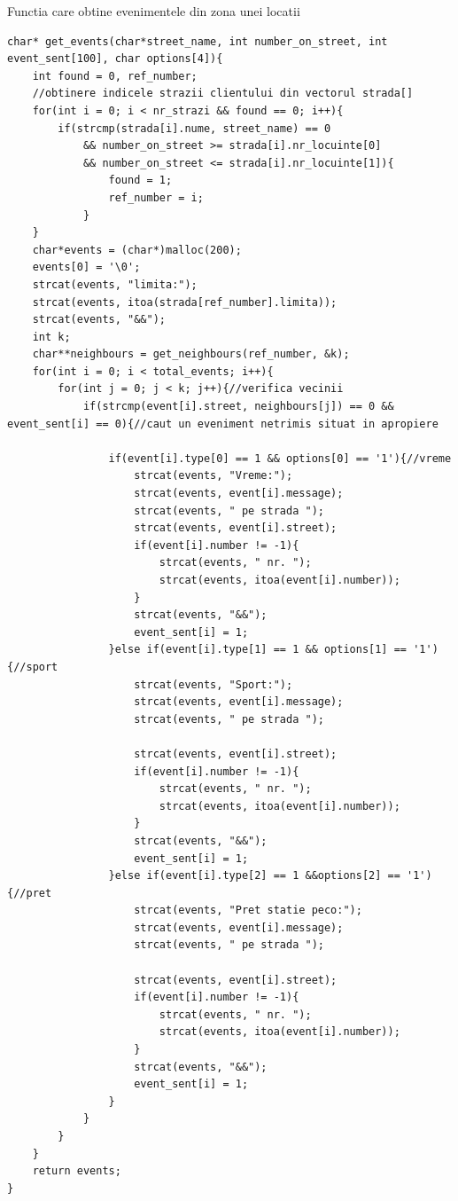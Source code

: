 \documentclass[runningheads]{llncs}
\begin{document}
Functia care obtine evenimentele din zona unei locatii
\begin{lstlisting}
char* get_events(char*street_name, int number_on_street, int event_sent[100], char options[4]){
    int found = 0, ref_number;
    //obtinere indicele strazii clientului din vectorul strada[]
    for(int i = 0; i < nr_strazi && found == 0; i++){
        if(strcmp(strada[i].nume, street_name) == 0 
            && number_on_street >= strada[i].nr_locuinte[0]                                    
            && number_on_street <= strada[i].nr_locuinte[1]){
                found = 1;
                ref_number = i;
            }
    }
    char*events = (char*)malloc(200);
    events[0] = '\0';
    strcat(events, "limita:");
    strcat(events, itoa(strada[ref_number].limita));
    strcat(events, "&&");
    int k;
    char**neighbours = get_neighbours(ref_number, &k);
    for(int i = 0; i < total_events; i++){
        for(int j = 0; j < k; j++){//verifica vecinii
            if(strcmp(event[i].street, neighbours[j]) == 0 && event_sent[i] == 0){//caut un eveniment netrimis situat in apropiere

                if(event[i].type[0] == 1 && options[0] == '1'){//vreme
                    strcat(events, "Vreme:");
                    strcat(events, event[i].message);
                    strcat(events, " pe strada ");
                    strcat(events, event[i].street);
                    if(event[i].number != -1){
                        strcat(events, " nr. ");
                        strcat(events, itoa(event[i].number));
                    }
                    strcat(events, "&&");
                    event_sent[i] = 1;
                }else if(event[i].type[1] == 1 && options[1] == '1'){//sport
                    strcat(events, "Sport:");
                    strcat(events, event[i].message);
                    strcat(events, " pe strada ");
                    
                    strcat(events, event[i].street);
                    if(event[i].number != -1){
                        strcat(events, " nr. ");
                        strcat(events, itoa(event[i].number));
                    }
                    strcat(events, "&&");
                    event_sent[i] = 1;
                }else if(event[i].type[2] == 1 &&options[2] == '1'){//pret
                    strcat(events, "Pret statie peco:");
                    strcat(events, event[i].message);
                    strcat(events, " pe strada ");
                    
                    strcat(events, event[i].street);
                    if(event[i].number != -1){
                        strcat(events, " nr. ");
                        strcat(events, itoa(event[i].number));
                    }
                    strcat(events, "&&");
                    event_sent[i] = 1;
                }
            }
        }
    }
    return events;
}
\end{lstlisting}
\end{document}
